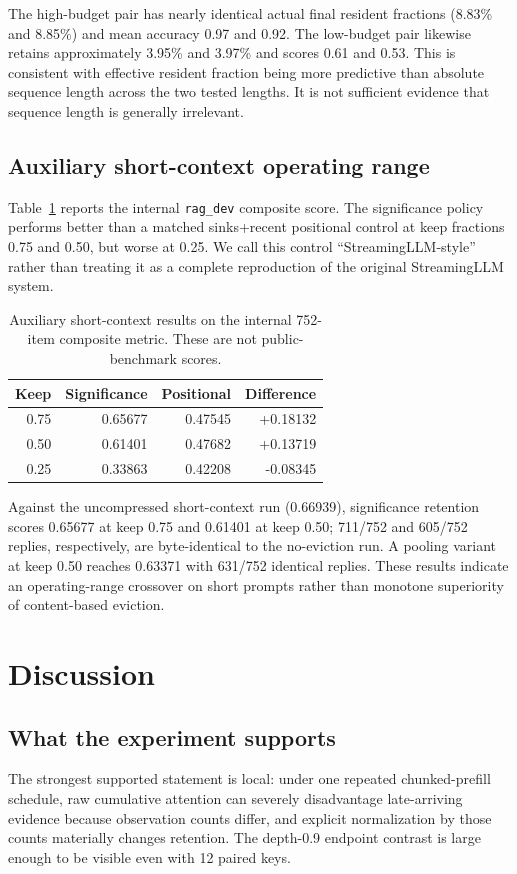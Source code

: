 \documentclass[10pt,twocolumn]{article}
\begin{document}
The high-budget pair has nearly identical actual final resident fractions (8.83\% and 8.85\%) and mean accuracy 0.97 and 0.92. The low-budget pair likewise retains approximately 3.95\% and 3.97\% and scores 0.61 and 0.53. This is consistent with effective resident fraction being more predictive than absolute sequence length across the two tested lengths. It is not sufficient evidence that sequence length is generally irrelevant.

\subsection{Auxiliary short-context operating range}
Table~\ref{tab:short} reports the internal \texttt{rag\_dev} composite score. The significance policy performs better than a matched sinks+recent positional control at keep fractions 0.75 and 0.50, but worse at 0.25. We call this control ``StreamingLLM-style'' rather than treating it as a complete reproduction of the original StreamingLLM system.

\begin{table}[t]
\centering
\caption{Auxiliary short-context results on the internal 752-item composite metric. These are not public-benchmark scores.}
\label{tab:short}
\small
\begin{tabular}{rrrr}
\toprule
Keep & Significance & Positional & Difference \\
\midrule
0.75 & 0.65677 & 0.47545 & +0.18132 \\
0.50 & 0.61401 & 0.47682 & +0.13719 \\
0.25 & 0.33863 & 0.42208 & -0.08345 \\
\bottomrule
\end{tabular}
\end{table}

Against the uncompressed short-context run (0.66939), significance retention scores 0.65677 at keep 0.75 and 0.61401 at keep 0.50; 711/752 and 605/752 replies, respectively, are byte-identical to the no-eviction run. A pooling variant at keep 0.50 reaches 0.63371 with 631/752 identical replies. These results indicate an operating-range crossover on short prompts rather than monotone superiority of content-based eviction.

\section{Discussion}
\subsection{What the experiment supports}
The strongest supported statement is local: under one repeated chunked-prefill schedule, raw cumulative attention can severely disadvantage late-arriving evidence because observation counts differ, and explicit normalization by those counts materially changes retention. The depth-0.9 endpoint contrast is large enough to be visible even with 12 paired keys.
\end{document}
